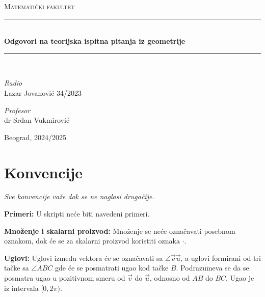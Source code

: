 \documentclass[12pt]{article}
\newcommand{\vek}[1]{\overrightarrow{#1}}
\begin{document}
\begin{titlepage}

    \newcommand{\HRule}{\rule{\linewidth}{0.4mm}}
    \center
    \textsc{\LARGE Matematički fakultet}\\[5cm]

    \HRule\\[0.4cm]
    {\LARGE\bfseries Odgovori na teorijska ispitna pitanja iz geometrije}\\[0.2cm]
    \HRule\\[2cm]

    \vspace{17\baselineskip}
    \begin{minipage}[t]{0.4\textwidth}
        \begin{flushleft}
            \large
            \textit{Radio}\\
            Lazar Jovanović 34/2023
        \end{flushleft}
    \end{minipage}
    \hspace*{1cm}
    \begin{minipage}[t]{0.4\textwidth}
        \begin{flushright}
            \large
            \textit{Profesor}\\
            dr Srđan Vukmirović
        \end{flushright}
    \end{minipage}

    \vfill\vfill\vfill\vfill
    {\large Beograd, 2024/2025}
    \vfill

\end{titlepage}

\tableofcontents
\newpage

\section{Konvencije}
\textit{Sve konvencije važe dok se ne naglasi drugačije.}
\par
\vspace*{1cm}

\textbf{Primeri:} U skripti neće biti navedeni primeri.

\textbf{Množenje i skalarni proizvod:} Množenje se neće označavati posebnom
oznakom, dok će se za skalarni proizvod koristiti oznaka $\cdot$.
\par

\textbf{Uglovi:} Uglovi između vektora će se označavati sa
$\angle{\vek{v}\vek{u}}$, a uglovi formirani od tri tačke sa $\angle{ABC}$ gde
će se posmatrati ugao kod tačke $B$. Podrazumeva se da se posmatra ugao u
pozitivnom smeru od $\vek{v}$ do $\vek{u}$, odnosno od $AB$ do $BC$. Ugao je iz
intervala $[0,2\pi)$.
\end{document}
